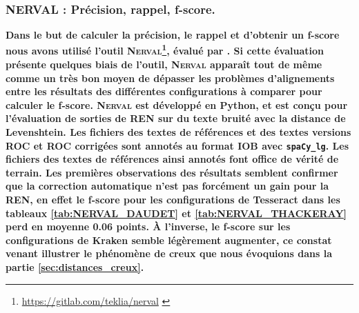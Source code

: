 


\subsubsection{\textsc{NERVAL} : Précision, rappel, f-score.}
\label{subsec:NERVAL_COR-OCR-IMPACT-NER}
\textbf{Dans le but de calculer la précision, le rappel et d'obtenir un f-score nous avons utilisé l'outil \textsc{Nerval}\footnote{\url{https://gitlab.com/teklia/nerval} \cite{nerval2021}}, évalué par \cite{koudoro2022reconnaissance}. Si cette évaluation présente quelques biais de l'outil, \textsc{Nerval} apparaît tout de même comme un très bon moyen de dépasser les problèmes d'alignements entre les résultats des différentes configurations à comparer pour calculer le f-score. \textsc{Nerval} est développé en Python, et est conçu pour l'évaluation de sorties de REN sur du texte bruité avec la distance de Levenshtein. Les fichiers des textes de références et des textes versions ROC et ROC corrigées sont annotés au format IOB avec \texttt{spaCy\_lg}. Les fichiers des textes de références ainsi annotés font office de vérité de terrain.
Les premières observations des résultats semblent confirmer que la correction automatique n'est pas forcément un gain pour la REN, en effet le f-score pour les configurations de Tesseract dans les tableaux \ref{tab:NERVAL_DAUDET} et \ref{tab:NERVAL_THACKERAY} perd en moyenne 0.06 points. À l'inverse, le f-score sur les configurations de Kraken semble légèrement augmenter, ce constat venant illustrer le phénomène de creux que nous évoquions dans la partie \ref{sec:distances_creux}.}

